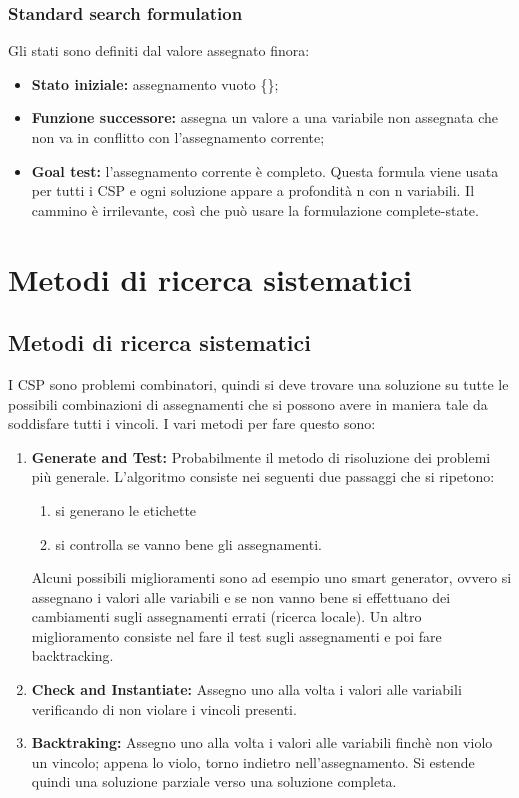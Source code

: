 \subsection{Standard search formulation}
Gli stati sono definiti dal valore assegnato finora:
\begin{itemize}
    \item \textbf{Stato iniziale: }assegnamento vuoto \{\};
    \item \textbf{Funzione successore: }assegna un valore a una variabile non assegnata che non va in conflitto con l’assegnamento corrente;
    \item \textbf{Goal test: }l’assegnamento corrente è completo. Questa formula viene usata per tutti i CSP e ogni soluzione appare a profondità n con n variabili. Il cammino è irrilevante, così che può usare la formulazione complete-state.
\end{itemize}


\chapter{Metodi di ricerca sistematici} \label{ch:Metodi di ricerca sistematici}
\section{Metodi di ricerca sistematici}
I CSP sono problemi combinatori, quindi si deve trovare una soluzione su tutte le possibili combinazioni di assegnamenti che si possono avere in maniera tale da soddisfare tutti i vincoli. I vari metodi per fare questo sono:
\begin{enumerate}
    \item \textbf{Generate and Test: }Probabilmente il metodo di risoluzione dei problemi più generale. L’algoritmo consiste nei seguenti due passaggi che si ripetono:
    \begin{enumerate}
        \item si generano le etichette
        \item si controlla se vanno bene gli assegnamenti.
    \end{enumerate}
    Alcuni possibili miglioramenti sono ad esempio uno smart generator, ovvero si assegnano i valori alle variabili e se non vanno bene si effettuano dei cambiamenti sugli assegnamenti errati (ricerca locale). Un altro miglioramento consiste nel fare il test sugli assegnamenti e poi fare backtracking.
    \item \textbf{Check and Instantiate: }Assegno uno alla volta i valori alle variabili verificando di non violare i vincoli presenti.
    \item \textbf{Backtraking:} Assegno uno alla volta i valori alle variabili finchè non violo un vincolo; appena lo violo, torno indietro nell’assegnamento. Si estende quindi una soluzione parziale verso una soluzione completa.
\end{enumerate}


